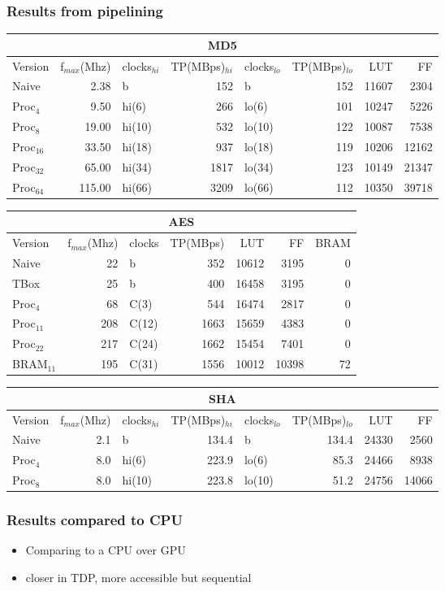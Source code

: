 \begin{frame}
  \frametitle{Results from pipelining}
\fontsize{6pt}{7.2}\selectfont
\begin{tabular}{l r l r l r r r}
\multicolumn{8}{c}{MD5}\\
\hline
Version & f$_{max}$(Mhz) & clocks$_{hi}$ & TP(MBps)$_{hi}$ &clocks$_{lo}$ & TP(MBps)$_{lo}$ & LUT & FF\\
\hline
Naive     & 2.38   & b      & 152 & b     & 152 & 11607 & 2304\\
Proc$_{4}$ & 9.50   & hi(6)  & 266 & lo(6) & 101 & 10247 & 5226\\
Proc$_{8}$ & 19.00  & hi(10) & 532 & lo(10)& 122 & 10087 & 7538\\
Proc$_{16}$ & 33.50  & hi(18) & 937 & lo(18)& 119 & 10206 & 12162\\
Proc$_{32}$ & 65.00  & hi(34) & 1817& lo(34)& 123 & 10149 & 21347\\
Proc$_{64}$ & 115.00 & hi(66) & 3209& lo(66)&112 &  10350 & 39718\\
\end{tabular}
\vspace{10px}
\begin{tabular}{l r l r r r r}
\multicolumn{7}{c}{AES}\\
\hline
Version & f$_{max}$(Mhz) & clocks & TP(MBps) & LUT & FF & BRAM\\
\hline
Naive      &   22 & b          & 352    & 10612     &  3195 & 0\\
TBox       &  25 & b           & 400 & 16458 & 3195 & 0\\
Proc$_{4}$  &  68 & C(3) & 544 & 16474 & 2817 & 0\\
Proc$_{11}$ & 208 & C(12) & 1663 & 15659 & 4383 & 0\\
Proc$_{22}$ & 217 & C(24) & 1662 & 15454 & 7401 & 0\\
BRAM$_{11}$ & 195 & C(31)  & 1556 & 10012 & 10398 & 72
\end{tabular}
\begin{tabular}{l r l r l r r r}
\multicolumn{8}{c}{SHA}\\
\hline
Version & f$_{max}$(Mhz) & clocks$_{hi}$ & TP(MBps)$_{hi}$ &clocks$_{lo}$ & TP(MBps)$_{lo}$ & LUT & FF\\
\hline
Naive    & 2.1 & b & 134.4 & b & 134.4 & 24330 & 2560\\
Proc$_{4}$ & 8.0 & hi(6) & 223.9 & lo(6) & 85.3 & 24466 & 8938\\
Proc$_{8}$ & 8.0 & hi(10) & 223.8 & lo(10) & 51.2 & 24756 & 14066\\
\end{tabular}
\end{frame}

\begin{frame}
  \frametitle{Results compared to CPU}
  \begin{itemize}
    \item Comparing to a CPU over GPU
    \item closer in TDP, more accessible but sequential
  \end{itemize}
\end{frame}
